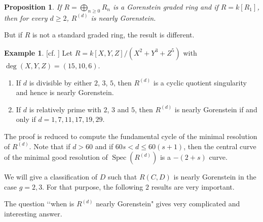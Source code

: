 \documentclass[12pt]{amsart}
\newtheorem{prop}[thm]{Proposition}
\theoremstyle{definition}
\newtheorem{ex}[thm]{Example}
\theoremstyle{remark}
\numberwithin{equation}{section}
\DeclareMathOperator{\Spec}{Spec}
\renewcommand{\:}{\colon}
\begin{document}
\begin{prop}\label{R(d)stand} If $R= \bigoplus_{n\ge 0} R_{n}$
 is a Gorenstein graded ring and if 
$R=k[R_1]$, then for every $d\ge 2$, $R^{(d)}$ is nearly Gorenstein. 
\end{prop}

But if $R$ is not a standard graded ring, the result is different. 

\begin{ex}\label{235+237}[\textrm{cf. \cite{MOWY}}] Let $R= k[X,Y,Z]/(X^2+Y^3+Z^5)$ with $\deg(X,Y,Z) = (15,10,6)$. 
\begin{enumerate}
\item[\rm{(a)}] If $d$ is divisible by either $2$, $3$, $5$, then $R^{(d)}$
is a cyclic quotient singularity and hence is nearly Gorenstein. 
\item[\rm{(b)}] If $d$ is relatively prime with $2$, $3$ and $5$, then $R^{(d)}$ is nearly 
Gorenstein if and only if $d = 1, 7, 11, 17, 19, 29$.  
\end{enumerate}

\par 
The proof is reduced to compute the fundamental cycle of the minimal resolution of $R^{(d)}$. 
Note that if $d>60$ and if $60s < d \le 60(s+1)$, 
then the central curve of 
the minimal good resolution of $\Spec(R^{(d)})$ is a $-(2+s)$ curve.
\end{ex}

\par 
We will give a classification of $D$ such that $R(C,D)$ is nearly 
Gorenstein in the case 
$g = 2,3$.  
For that purpose, the following $2$ results are very important. 
\par
The question \lq\lq when is $R^{(d)}$ nearly Gorenstein" gives very 
complicated and interesting answer.  
\end{document}
